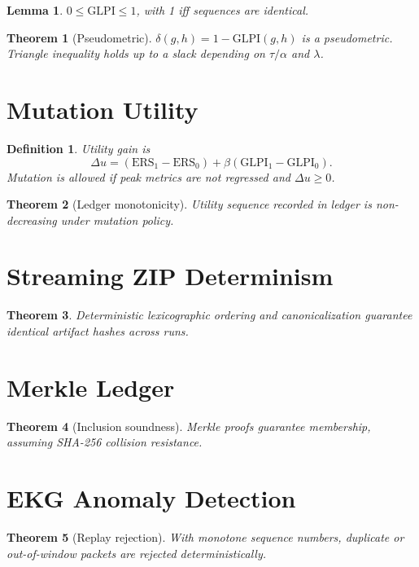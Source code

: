 \documentclass[12pt]{article}
\newtheorem{theorem}{Theorem}
\newtheorem{lemma}{Lemma}
\newtheorem{definition}{Definition}
\begin{document}
\begin{lemma}
$0 \le \mathrm{GLPI} \le 1$, with 1 iff sequences are identical.
\end{lemma}

\begin{theorem}[Pseudometric]
$\delta(g,h)=1-\mathrm{GLPI}(g,h)$ is a pseudometric. Triangle inequality holds up to a slack depending on $\tau/\alpha$ and $\lambda$.
\end{theorem}

\section{Mutation Utility}
\begin{definition}
Utility gain is
\[\Delta u = (\mathrm{ERS}_1-\mathrm{ERS}_0)+\beta(\mathrm{GLPI}_1-\mathrm{GLPI}_0).\]
Mutation is allowed if peak metrics are not regressed and $\Delta u \ge 0$.
\end{definition}

\begin{theorem}[Ledger monotonicity]
Utility sequence recorded in ledger is non-decreasing under mutation policy.
\end{theorem}

\section{Streaming ZIP Determinism}
\begin{theorem}
Deterministic lexicographic ordering and canonicalization guarantee identical artifact hashes across runs.
\end{theorem}

\section{Merkle Ledger}
\begin{theorem}[Inclusion soundness]
Merkle proofs guarantee membership, assuming SHA-256 collision resistance.
\end{theorem}

\section{EKG Anomaly Detection}
\begin{theorem}[Replay rejection]
With monotone sequence numbers, duplicate or out-of-window packets are rejected deterministically.
\end{theorem}
\end{document}
